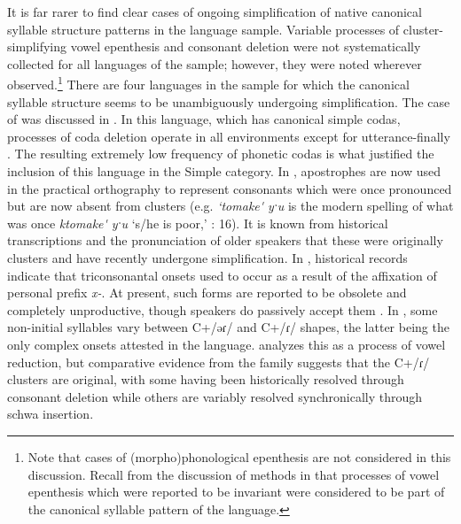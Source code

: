   It is far rarer to find clear cases of ongoing simplification of native canonical syllable structure patterns in the language sample. Variable processes of cluster-simplifying vowel epenthesis and consonant deletion were not systematically collected for all languages of the sample; however, they were noted wherever observed.\footnote{{Note that cases of (morpho)phonological epenthesis are not considered in this discussion. Recall from the discussion of methods in  that processes of vowel epenthesis which were reported to be invariant were considered to be part of the canonical syllable pattern of the language.}} There are four languages in the sample for which the canonical syllable structure seems to be unambiguously undergoing simplification. The case of  was discussed in . In this language, which has canonical simple codas, processes of coda deletion operate in all environments except for utterance-finally \citep[22--24]{Yumitani1998}. The resulting extremely low frequency of phonetic codas is what justified the inclusion of this language in the Simple category. In , apostrophes are now used in the practical orthography to represent consonants which were once pronounced but are now absent from clusters (e.g. \textit{‘tomake\'{} yˑu} is the modern spelling of what was once \textit{ktomake\'{} yˑu} ‘s/he is poor,’ \citealt{Leavitt1996}: 16). It is known from historical transcriptions and the pronunciation of older speakers that these were originally clusters and have recently undergone simplification. In , historical records indicate that triconsonantal onsets used to occur as a result of the affixation of personal prefix \textit{x-}. At present, such forms are reported to be obsolete and completely unproductive, though speakers do passively accept them \citep[66]{Cerrón-Palomino2006}. In , some non-initial syllables vary between C+/əɾ/ and C+/ɾ/ shapes, the latter being the only complex onsets attested in the language. \citet[30--32]{VanBreugel2008} analyzes this as a process of vowel reduction, but comparative evidence from the family suggests that the C+/ɾ/ clusters are original, with some having been historically resolved through consonant deletion while others are variably resolved synchronically through schwa insertion.

